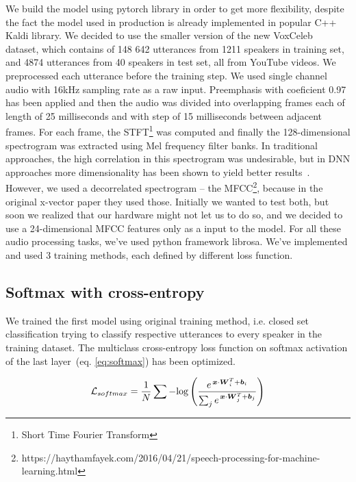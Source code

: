 We build the model using pytorch library in order to get more flexibility, despite the fact the model used in production is already implemented in popular C++ Kaldi library. We decided to use the smaller version of the new VoxCeleb~\cite{VoxCeleb} dataset, which contains of 148 642 utterances from 1211 speakers in training set, and 4874 utterances from 40 speakers in test set, all from YouTube videos. We preprocessed each utterance before the training step. We used single channel audio with 16kHz sampling rate as a raw input. Preemphasis with coeficient 0.97 has been applied and then the audio was divided into overlapping frames each of length of 25 milliseconds and with step of 15 milliseconds between adjacent frames. For each frame, the STFT\footnote{Short Time Fourier Transform} was computed and finally the 128-dimensional spectrogram was extracted using Mel frequency filter banks. In traditional approaches, the high correlation in this spectrogram was undesirable, but in DNN approaches more dimensionality has been shown to yield better results~\cite{CNN_2016}. However, we used a decorrelated spectrogram -- the MFCC\footnote{https://haythamfayek.com/2016/04/21/speech-processing-for-machine-learning.html}, because in the original x-vector paper they used those. Initially we wanted to test both, but soon we realized that our hardware might not let us to do so, and we decided to use a 24-dimensional MFCC features only as a input to the model. For all these audio processing tasks, we've used python framework librosa. We've implemented and used 3 training methods, each defined by different loss function.

\subsection*{Softmax with cross-entropy}

We trained the first model using original training method, i.e. closed set classification trying to classify respective utterances to every speaker in the training dataset. The multiclass cross-entropy loss function on softmax activation of the last layer~(eq. \ref{eq:softmax}) has been optimized.

\begin{equation} \label{eq:softmax}
\mathcal{L}_{softmax} = \frac{1}{N} \sum - \textnormal{log} \left( 
\frac{e^{\,\boldsymbol{x} \cdot \boldsymbol{W}_i^T + \boldsymbol{b}_i}}
{\sum_{j} e^{\,\boldsymbol{x} \cdot \boldsymbol{W}_j^T + \boldsymbol{b}_j}} 
\right)
\end{equation}

